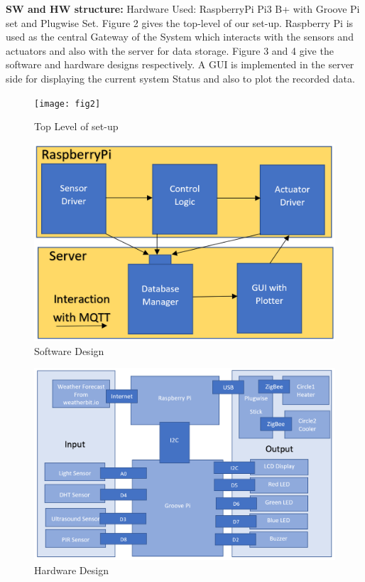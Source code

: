 \documentclass[runningheads]{llncs}
\begin{document}
\textbf{SW and HW structure:}
Hardware Used: RaspberryPi Pi3 B+ with Groove Pi set and Plugwise Set. Figure 2 gives the top-level of our set-up.
Raspberry Pi is used as the central Gateway of the System which interacts with the sensors and actuators and also with the server for data storage. Figure 3 and 4 give the software and hardware designs respectively. A GUI is implemented in the server side for displaying the current system Status and also to plot the recorded data. 


\begin{figure}
\begin{center}
\texttt{[image: fig2]}
\caption{Top Level of set-up}
\end{center}
\end{figure}
\begin{figure}
\begin{center}
\includegraphics[scale=0.5]{fig3}
\caption{Software Design}
\end{center}
\end{figure}
\begin{figure}
\begin{center}
\includegraphics[scale=0.5]{fig4}
\caption{Hardware Design}
\end{center}
\end{figure}
\end{document}
